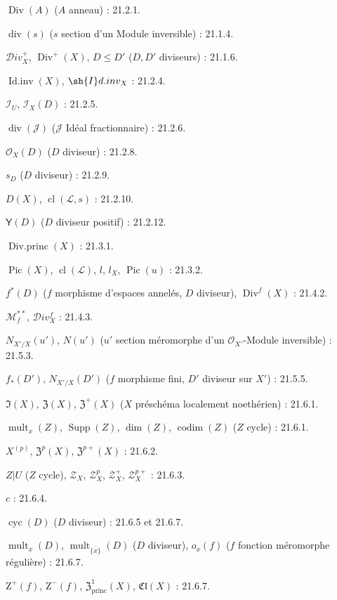 $\operatorname{Div}(A)$ ($A$ anneau) : 21.2.1.

$\operatorname{div}(s)$ ($s$ section d'un Module inversible) : 21.1.4.

$\mathcal{D}iv_X^+$, $\operatorname{Div}^+(X)$, $D\leq D'$
($D,D'$ diviseurs) : 21.1.6.

$\operatorname{Id.inv}(X)$, $\sh{I}d.inv_X$ : 21.2.4.

$\mathcal I_U$, $\mathcal I_X(D)$ : 21.2.5.

$\operatorname{div}(\mathcal J)$ ($\mathcal J$ Idéal fractionnaire) : 21.2.6.

$\mathcal O_X(D)$ ($D$ diviseur) : 21.2.8.

$s_D$ ($D$ diviseur) : 21.2.9.

$D(X)$, $\operatorname{cl}(\mathcal L,s)$ : 21.2.10.

$\boldsymbol{\mathsf{Y}}(D)$ ($D$ diviseur positif) : 21.2.12.

$\operatorname{Div.princ}(X)$ : 21.3.1.

$\operatorname{Pic}(X)$, $\operatorname{cl}(\mathcal L)$, $l$, $l_X$,
$\operatorname{Pic}(u)$ : 21.3.2.

$f^*(D)$ ($f$ morphisme d'espaces annelés, $D$ diviseur),
$\operatorname{Div}^f(X)$ : 21.4.2.

$\mathcal M_f^{**}$, $\mathcal{D}iv_X^f$ : 21.4.3.

$N_{X'/X}(u')$, $N(u')$
($u'$ section méromorphe d'un $\mathcal O_{X'}$-Module inversible) : 21.5.3.

$f_*(D')$, $N_{X'/X}(D')$
($f$ morphisme fini, $D'$ diviseur sur $X'$) : 21.5.5.

$\mathfrak I(X)$, $\mathfrak Z(X)$, $\mathfrak Z^+(X)$
($X$ préschéma localement noethérien) : 21.6.1.

$\operatorname{mult}_x(Z)$, $\operatorname{Supp}(Z)$,
$\dim(Z)$, $\operatorname{codim}(Z)$ ($Z$ cycle) : 21.6.1.

$X^{(p)}$, $\mathfrak Z^p(X)$, $\mathfrak Z^{p+}(X)$ : 21.6.2.

$Z|U$ ($Z$ cycle), $\mathscr Z_X$, $\mathscr Z_X^p$,
$\mathscr Z_X^+$, $\mathscr Z_X^{p+}$ : 21.6.3.

$c$ : 21.6.4.

$\operatorname{cyc}(D)$ ($D$ diviseur) : 21.6.5 et 21.6.7.

$\operatorname{mult}_x(D)$, $\operatorname{mult}_{\overline{\{x\}}}(D)$
($D$ diviseur), $o_x(f)$ ($f$ fonction méromorphe régulière) : 21.6.7.

$\mathrm Z^+(f)$, $\mathrm Z^-(f)$, $\mathfrak Z^1_{\mathrm{princ}}(X)$,
$\mathfrak{Cl}(X)$ : 21.6.7.


